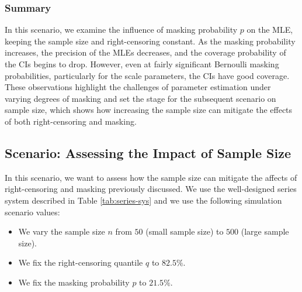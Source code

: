 \documentclass[
]{article}
\providecommand{\tightlist}{%
  \setlength{\itemsep}{0pt}\setlength{\parskip}{0pt}}
\theoremstyle{definition}
\theoremstyle{plain}
\theoremstyle{definition}
\theoremstyle{definition}
\theoremstyle{definition}
\theoremstyle{definition}
\theoremstyle{remark}
\begin{document}
\hypertarget{summary-1}{%
\subsubsection{Summary}\label{summary-1}}

In this scenario, we examine the influence of masking probability \(p\) on the
MLE, keeping the sample size and right-censoring constant. As the masking
probability increases, the precision of the MLEs decreases,
and the coverage probability of the CIs begins to drop. However, even at fairly
significant Bernoulli masking probabilities, particularly for the scale
parameters, the CIs have good coverage. These observations highlight the
challenges of parameter estimation under varying degrees of masking and set the
stage for the subsequent scenario on sample size, which shows how increasing the
sample size can mitigate the effects of both right-censoring and masking.

\hypertarget{effect-samp-size}{%
\subsection{Scenario: Assessing the Impact of Sample Size}\label{effect-samp-size}}

In this scenario, we want to assess how the sample size can mitigate the affects of
right-censoring and masking previously discussed. We use the well-designed series
system described in Table \ref{tab:series-sys} and we use the following
simulation scenario values:

\begin{itemize}
\tightlist
\item
  We vary the sample size \(n\) from \(50\) (small sample size) to \(500\) (large sample size).
\item
  We fix the right-censoring quantile \(q\) to \(82.5\%\).
\item
  We fix the masking probability \(p\) to \(21.5\%\).
\end{itemize}
\end{document}
